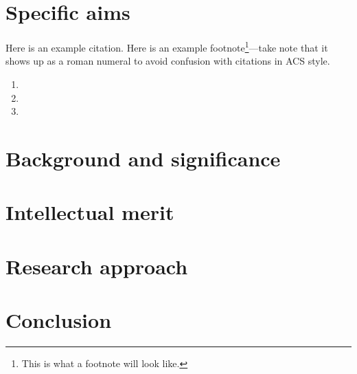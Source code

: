 \documentclass{suchem_rp}
\title{\lipsum[31][1-5]}
\author{Example Author}
\date{March 1, 2021}
\begin{document}
\maketitle

\section{Specific aims}
Here is an example citation.\autocite{example} Here is an example footnote\footnote{This is what a footnote will look like.}---take note that it shows up as a roman numeral to avoid confusion with citations in ACS style.

\lipsum[1-3]
\begin{enumerate}[label={\bf \arabic*.}]
    \item \lipsum[4-5]
    \item \lipsum[6-7]
    \item \lipsum[8-9]
\end{enumerate}

\section{Background and significance}
\lipsum[10-15]

\section{Intellectual merit}
\lipsum[16-20]

\section{Research approach}
\lipsum[21-39]

\section{Conclusion}
\lipsum[41-42]

\clearpage\printbibliography
\end{document}
